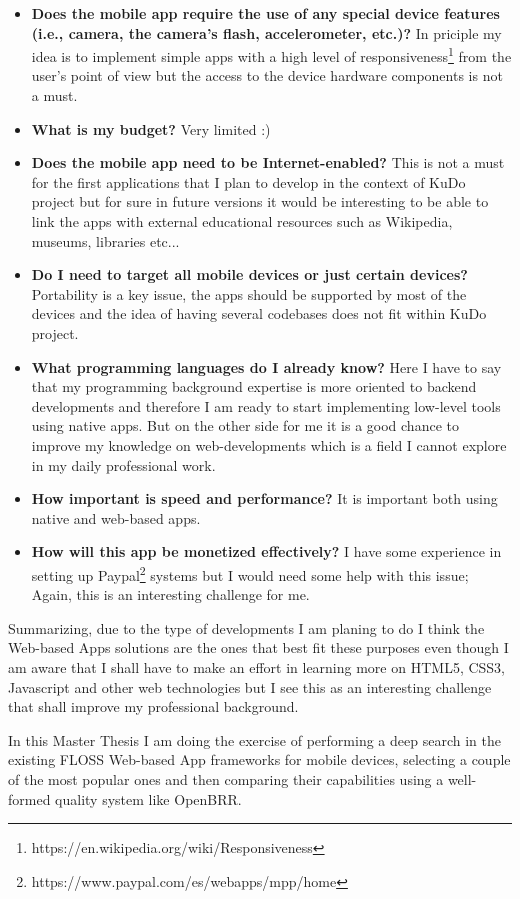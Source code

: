 \documentclass[a4paper,12pt]{book}
\begin{document}
\begin{itemize}
 \item \textbf{Does the mobile app require the use of any special device features (i.e., camera, the camera’s flash, accelerometer, etc.)?} In priciple my idea is to implement simple apps with a high level of responsiveness\footnote{https://en.wikipedia.org/wiki/Responsiveness}  from the user's point of view but the access to the device hardware components is not a must.
 \item \textbf{What is my budget?} Very limited :)
 \item \textbf{Does the mobile app need to be Internet-enabled?} This is not a must for the first applications that I plan to develop in the context of KuDo project but for sure in future versions it would be interesting to be able to link the apps with external educational resources such as Wikipedia, museums, libraries etc...
 \item \textbf{Do I need to target all mobile devices or just certain devices?} Portability is a key issue, the apps should be supported by most of the devices and the idea of having several codebases does not fit within KuDo project.
 \item \textbf{What programming languages do I already know?} Here I have to say that my programming background expertise is more oriented to backend developments and therefore I am ready to start implementing low-level tools using native apps. But on the other side for me it is a good chance to improve my knowledge on web-developments which is a field I cannot explore in my daily professional work.
 \item \textbf{How important is speed and performance?} It is important both using native and web-based apps.
 \item \textbf{How will this app be monetized effectively?} I have some experience in setting up Paypal\footnote{https://www.paypal.com/es/webapps/mpp/home}  systems but I would need some help with this issue; Again, this is an interesting challenge for me.
\end{itemize}

Summarizing, due to the type of developments I am planing to do I think the Web-based Apps solutions are the ones that best fit these purposes even though I am aware that I shall have to make an effort in learning more on HTML5, CSS3, Javascript and other web technologies but I see this as an interesting challenge that shall improve my professional background.

In this Master Thesis I am doing the exercise of performing a deep search in the existing FLOSS Web-based App frameworks for mobile devices, selecting a couple of the most popular ones and then comparing their capabilities using a well-formed quality system like OpenBRR.
\end{document}

